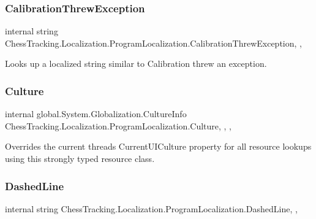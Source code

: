 \subsubsection{\texorpdfstring{CalibrationThrewException}{CalibrationThrewException}}
{\footnotesize\ttfamily internal string Chess\+Tracking.\+Localization.\+Program\+Localization.\+Calibration\+Threw\+Exception\hspace{0.3cm}{\ttfamily [static]}, {\ttfamily [get]}, {\ttfamily [private]}}



Looks up a localized string similar to Calibration threw an exception. 

\mbox{\label{class_chess_tracking_1_1_localization_1_1_program_localization_aaf2ff633f1ecefd4336b40becf6829f7}} 
\subsubsection{\texorpdfstring{Culture}{Culture}}
{\footnotesize\ttfamily internal global.\+System.\+Globalization.\+Culture\+Info Chess\+Tracking.\+Localization.\+Program\+Localization.\+Culture\hspace{0.3cm}{\ttfamily [static]}, {\ttfamily [get]}, {\ttfamily [set]}, {\ttfamily [private]}}



Overrides the current thread\textquotesingle{}s Current\+U\+I\+Culture property for all resource lookups using this strongly typed resource class. 

\mbox{\label{class_chess_tracking_1_1_localization_1_1_program_localization_ab5a14a9d326a39123fa97e7c049a0796}} 
\subsubsection{\texorpdfstring{DashedLine}{DashedLine}}
{\footnotesize\ttfamily internal string Chess\+Tracking.\+Localization.\+Program\+Localization.\+Dashed\+Line\hspace{0.3cm}{\ttfamily [static]}, {\ttfamily [get]}, {\ttfamily [private]}}




